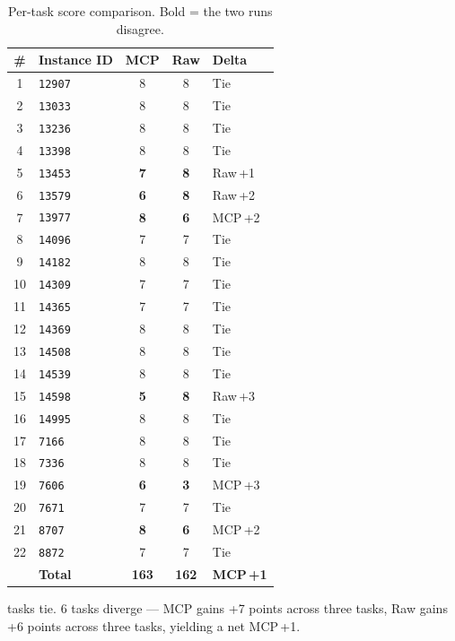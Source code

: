 \begin{table}[h]
\centering
\small
\caption{Per-task score comparison.  Bold = the two runs disagree.}\label{tab:h2h}
\setlength{\tabcolsep}{3.5pt}
\begin{tabular}{clccl}
\toprule
\textbf{\#} & \textbf{Instance ID} & \textbf{MCP} & \textbf{Raw} & \textbf{Delta} \\
\midrule
 1 & \texttt{12907}  & 8 & 8 & Tie \\
 2 & \texttt{13033}  & 8 & 8 & Tie \\
 3 & \texttt{13236}  & 8 & 8 & Tie \\
 4 & \texttt{13398}  & 8 & 8 & Tie \\
 5 & \texttt{13453}  & \textbf{7} & \textbf{8} & Raw\,+1 \\
 6 & \texttt{13579}  & \textbf{6} & \textbf{8} & Raw\,+2 \\
 7 & \texttt{13977}  & \textbf{8} & \textbf{6} & MCP\,+2 \\
 8 & \texttt{14096}  & 7 & 7 & Tie \\
 9 & \texttt{14182}  & 8 & 8 & Tie \\
10 & \texttt{14309}  & 7 & 7 & Tie \\
11 & \texttt{14365}  & 7 & 7 & Tie \\
12 & \texttt{14369}  & 8 & 8 & Tie \\
13 & \texttt{14508}  & 8 & 8 & Tie \\
14 & \texttt{14539}  & 8 & 8 & Tie \\
15 & \texttt{14598}  & \textbf{5} & \textbf{8} & Raw\,+3 \\
16 & \texttt{14995}  & 8 & 8 & Tie \\
17 & \texttt{7166}   & 8 & 8 & Tie \\
18 & \texttt{7336}   & 8 & 8 & Tie \\
19 & \texttt{7606}   & \textbf{6} & \textbf{3} & MCP\,+3 \\
20 & \texttt{7671}   & 7 & 7 & Tie \\
21 & \texttt{8707}   & \textbf{8} & \textbf{6} & MCP\,+2 \\
22 & \texttt{8872}   & 7 & 7 & Tie \\
\midrule
   & \textbf{Total}  & \textbf{163} & \textbf{162} & \textbf{MCP\,+1} \\
\bottomrule
\end{tabular}
\end{table}

 tasks tie.
6 tasks diverge --- MCP gains +7 points across three tasks,
Raw gains +6 points across three tasks, yielding a net MCP\,+1.

